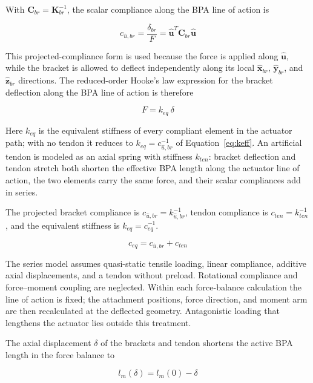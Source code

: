 With $\mathbf{C}_{br}=\mathbf{K}_{br}^{-1}$, the scalar compliance along the BPA line of action is

\begin{equation}
c_{\hat{u},br} = \frac{\delta_{br}}{F} = \hat{\mathbf{u}}^{T} \mathbf{C}_{br} \hat{\mathbf{u}}
\label{eq:keff}
\end{equation}

This projected-compliance form is used because the force is applied along $\hat{\mathbf{u}}$, while the bracket is allowed to deflect independently along its local $\hat{\mathbf{x}}_{br}$, $\hat{\mathbf{y}}_{br}$, and $\hat{\mathbf{z}}_{br}$ directions. The reduced-order Hooke's law expression for the bracket deflection along the BPA line of action is therefore

\begin{equation} F = k_{eq} \: \delta
\label{eq:hookereduced}
\end{equation}

Here $k_{eq}$ is the equivalent stiffness of every compliant element in the actuator path; with no tendon it reduces to $k_{eq}=c_{\hat{u},br}^{-1}$ of Equation~\eqref{eq:keff}. An artificial tendon is modeled as an axial spring with stiffness $k_{ten}$: bracket deflection and tendon stretch both shorten the effective BPA length along the actuator line of action, the two elements carry the same force, and their scalar compliances add in series.

The projected bracket compliance is $c_{\hat{u},br}=k_{\hat{u},br}^{-1}$, tendon compliance is $c_{ten}=k_{ten}^{-1}$, and the equivalent stiffness is $k_{eq}=c_{eq}^{-1}$.\par
\begin{equation} c_{eq} = c_{\hat{u},br} + c_{ten}
\label{eq:equivalentstiffness}
\end{equation}

The series model assumes quasi-static tensile loading, linear compliance, additive axial displacements, and a tendon without preload. Rotational compliance and force--moment coupling are neglected. Within each force-balance calculation the line of action is fixed; the attachment positions, force direction, and moment arm are then recalculated at the deflected geometry. Antagonistic loading that lengthens the actuator lies outside this treatment.

The axial displacement $\delta$ of the brackets and tendon shortens the active BPA length in the force balance to

\begin{equation} l_m(\delta) = l_m{(0)} - \delta
\label{eq:activelengthcorrected}
\end{equation}

